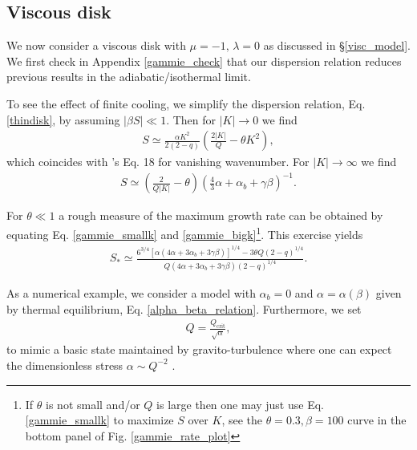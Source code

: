 \subsection{Viscous disk}\label{2dvisc}
We now consider a viscous disk with 
$\mu=-1,\,\lambda=0$ as discussed in \S\ref{visc_model}. We first
check in Appendix \ref{gammie_check} that our dispersion relation
reduces previous results in the adiabatic/isothermal limit.  

To see the effect of finite cooling, we simplify the dispersion relation,
Eq. \ref{thindisk}, by assuming $|\beta S|\ll 1$. Then  
for $|K| \to 0$ we find
\begin{align}\label{gammie_smallk}
  S\simeq \frac{\alpha K^2}{2(2-q)}\left(\frac{2|K|}{Q} - \theta
  K^2\right), 
\end{align}
which coincides with \citeauthor{gammie96}'s Eq. 18 for vanishing
wavenumber. For $|K|\to\infty$ we find
\begin{align}\label{gammie_bigk}
  S \simeq\left(\frac{2}{Q|K|} - \theta\right)\left(\frac{4}{3}\alpha + 
  \alpha_b + \gamma\beta\right)^{-1}.
\end{align}



For $\theta\ll1$ a rough measure of the maximum growth rate can be obtained by
equating Eq. \ref{gammie_smallk} and \ref{gammie_bigk}\footnote{If
  $\theta$ is not small and/or $Q$  is large then one may just use Eq. \ref{gammie_smallk}
  to maximize $S$ over $K$, see the $\theta=0.3,\beta=100$ curve in the bottom
  panel of Fig. \ref{gammie_rate_plot}}.  
This exercise yields 
\begin{align}\label{gammie_maxrate_simple}
  S_*\simeq \frac{
    6^{3/4}\left[\alpha\left(4\alpha +
      3\alpha_b + 3\gamma\beta\right)\right]^{1/4} - 3\theta
    Q(2-q)^{1/4}}{Q\left(4\alpha + 3\alpha_b +
    3\gamma\beta\right)(2-q)^{1/4}}. 
\end{align} 

As a numerical example, we consider a model with $\alpha_b=0$ and
$\alpha=\alpha(\beta)$ given by thermal equilibrium,
Eq. \ref{alpha_beta_relation}. Furthermore, we set
\begin{align}
  Q = \frac{Q_\mathrm{crit}}{\sqrt{\alpha}},\label{Qalpha}
\end{align}
to mimic a basic state maintained by gravito-turbulence where one can 
expect the dimensionless stress $\alpha \sim Q^{-2}$ \citep{lin87}.  

